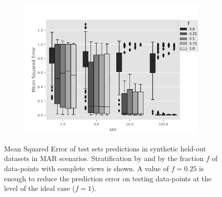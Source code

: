 \begin{figure}[htb]
\centering
\begin{subfigure}{.49\textwidth}
	\centering
        \includegraphics[width=\textwidth]{./tex/fig/mar_pred_err_boxplot.pdf}
\end{subfigure}%
\caption{
Mean Squared Error of test sets predictions in synthetic held-out datasets in MAR scenarios.
Stratification by \snr and by the fraction $f$ of data-points with complete views is shown.
A value of $f = 0.25$ is enough to reduce the prediction error on testing data-points at the level of the ideal case ($f=1$).
}
\label{fig:synthetic_benchmark_pred_box}
\end{figure}

